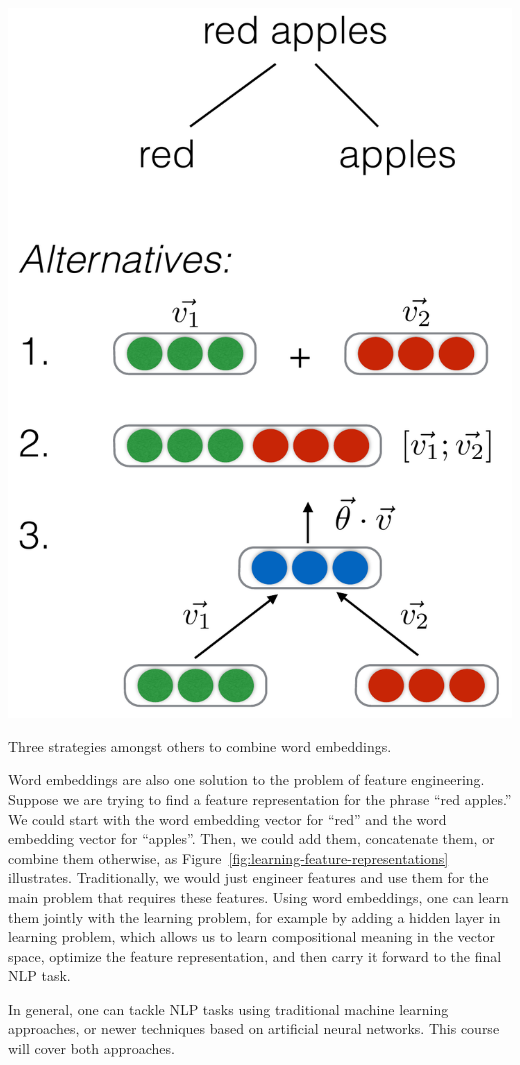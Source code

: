 \documentclass[justified, marginals=justified]{tufte-handout}
\begin{document}
\begin{marginfigure}
  \includegraphics[width=\linewidth]{learning-feature-representations.pdf}
  \caption{Three strategies amongst others to combine word embeddings.}
  \label{fig:learning-feature-representations}
\end{marginfigure}


\medskip


Word embeddings are also one solution to the problem of feature engineering. Suppose we are trying to find a feature representation for the phrase ``red apples.'' We could start with the word embedding vector for ``red'' and the word embedding vector for ``apples''. Then, we could add them, concatenate them, or combine them otherwise, as Figure~\ref{fig:learning-feature-representations} illustrates. Traditionally, we would just engineer features and use them for the main problem that requires these features. Using word embeddings, one can learn them jointly with the learning problem, for example by adding a hidden layer in learning problem, which allows us to learn compositional meaning in the vector space, optimize the feature representation, and then carry it forward to the final NLP task.\medskip

In general, one can tackle NLP tasks using traditional machine learning approaches, or newer techniques based on artificial neural networks. This course will cover both approaches. 

%
%
\end{document}

